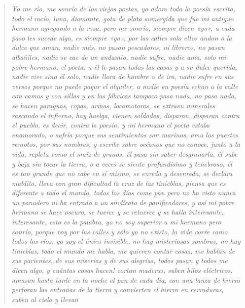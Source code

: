 \documentclass[12pt]{article}
\begin{document}
\clearpage
{}
\begin{verse}
\itshape
Yo me río,  
me sonrío  
de los viejos poetas,  
yo adoro toda  
la poesía escrita,  
todo el rocío,  
luna, diamante, gota  
de plata sumergida  
que fue mi antiguo hermano  
agregando a la rosa,  
pero  
me sonrío,  
siempre dicen «yo»,  
a cada paso  
les sucede algo,  
es siempre «yo»,  
por las calles  
solo ellos andan  
o la dulce que aman,  
nadie más,  
no pasan pescadores,  
ni libreros,  
no pasan albañiles,  
nadie se cae  
de un andamio,  
nadie sufre,  
nadie ama,  
solo mi pobre hermano,  
el poeta,  
a él le pasan  
todas las cosas  
y a su dulce querida,  
nadie vive  
sino él solo,  
nadie llora de hambre  
o de ira,  
nadie sufre en sus versos  
porque no puede  
pagar el alquiler,  
a nadie en poesía  
echan a la calle  
con camas y con sillas  
y en las fábricas  
tampoco pasa nada,  
no pasa nada,  
se hacen paraguas, copas,  
armas, locomotoras,  
se extraen minerales  
rascando el infierno,  
hay huelga,  
vienen soldados,  
disparan,  
disparan contra el pueblo,  
es decir,  
contra la poesía,  
y mi hermano  
el poeta  
estaba enamorado,  
o sufría  
porque sus sentimientos  
son marinos,  
ama los puertos  
remotos, por sus nombres,  
y escribe sobre océanos  
que no conoce,  
junto a la vida, repleta  
como el maíz de granos,  
él pasa sin saber  
desgranarla,  
él sube y baja  
sin tocar la tierra,  
o a veces  
se siente profundísimo  
y tenebroso,  
él es tan grande  
que no cabe en sí mismo,  
se enreda y desenreda,  
se declara maldito,  
lleva con gran dificultad la cruz  
de las tinieblas,  
piensa que es diferente  
a todo el mundo,  
todos los días come pan  
pero no ha visto nunca  
un panadero  
ni ha entrado a un sindicato  
de panificadores,  
y así mi pobre hermano  
se hace oscuro,  
se tuerce y se retuerce  
y se halla  
interesante,  
interesante,  
esta es la palabra,  
yo no soy superior  
a mi hermano  
pero sonrío,  
porque voy por las calles  
y sólo yo no existo,  
la vida corre  
como todos los ríos,  
yo soy el único  
invisible,  
no hay misteriosas sombras,  
no hay tinieblas,  
todo el mundo me habla,  
me quieren contar cosas,  
me hablan de sus parientes,  
de sus miserias  
y de sus alegrías,  
todos pasan y todos  
me dicen algo,  
y cuántas cosas hacen!  
cortan maderas,  
suben hilos eléctricos,  
amasan hasta tarde en la noche  
el pan de cada día,  
con una lanza de hierro  
perforan las entrañas  
de la tierra  
y convierten el hierro  
en cerraduras,  
suben al cielo y llevan  

\end{verse}
\end{document}
